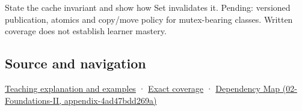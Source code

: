 State the cache invariant and show how Set invalidates it. Pending: versioned publication, atomics and copy/move policy for mutex-bearing classes. Written coverage does not establish learner mastery.

\subsection{Source and navigation}\label{appendix-f5593256bcaf-source-and-navigation}

\hyperref[01-foundations-i-ch003-a-cache-may-change-bits-without-changing-meaning]{Teaching explanation and examples} · \hyperref[appendix-fd090d982a15-m008---parts-113-126]{Exact coverage} · \href{../02-Foundations-II/main.pdf\#nameddest=appendix-4ad47bdd269a}{Dependency Map (02-Foundations-II, appendix-4ad47bdd269a)}
